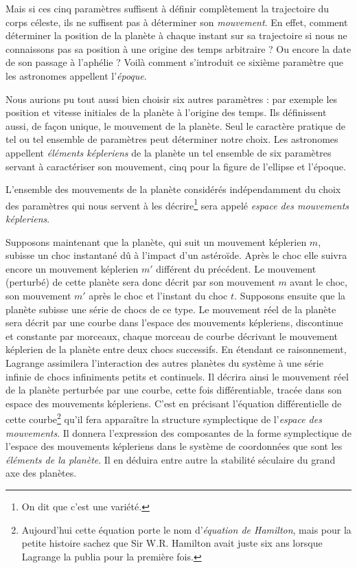 \documentclass[12pt,paperletter, reqno]{amsart}
\theoremstyle{plain}
\theoremstyle{remark}
\begin{document}
  Mais si ces cinq paramètres suffisent à définir complètement la trajectoire du corps céleste,
  ils ne suffisent pas à déterminer son \emph{mouvement}.
  En effet,
  comment déterminer la position de la planète à chaque instant sur sa trajectoire si nous ne connaissons pas sa position à une origine des temps arbitraire ?
  Ou encore la date de son passage à l'aphélie ?
  Voilà comment s'introduit ce sixième paramètre que les astronomes appellent l'\emph{époque}.
  
  Nous aurions pu tout aussi bien choisir six autres paramètres :
  par exemple les position et vitesse initiales de la planète à l'origine des temps.
  Ils définissent aussi,
  de façon unique,
  le mouvement de la planète.
  Seul le caractère pratique de tel ou tel ensemble de paramètres peut déterminer notre choix.
  Les astronomes appellent \emph{éléments képleriens} de la planète un tel ensemble de six paramètres servant à caractériser son mouvement,
  cinq pour la figure de l'ellipse et l'époque.
  
  L'ensemble des mouvements de la planète considérés indépendamment du choix des paramètres qui nous servent à les décrire\footnote{On dit que c'est une variété.} sera appelé \emph{espace des mouvements képleriens}.
  
  Supposons maintenant que la planète,
  qui suit un mouvement képlerien $m$,
  subisse un choc instantané dû à l'impact d'un astéroïde.
  Après le choc elle suivra encore un mouvement képlerien $m'$ différent du précédent.
  Le mouvement (perturbé) de cette planète sera donc décrit par son mouvement $m$ avant le choc,
  son mouvement $m'$ après le choc et l'instant du choc $t$.
  Supposons ensuite que la planète subisse une série de chocs de ce type.
  Le mouvement réel de la planète sera décrit par une courbe dans l'espace des mouvements képleriens,
  discontinue et constante par morceaux,
  chaque morceau de courbe décrivant le mouvement képlerien de la planète entre deux chocs successifs.
  En étendant ce raisonnement,
  Lagrange assimilera l'interaction des autres planètes du système à une série infinie de chocs \og infiniments petits et continuels\fg{}.
  Il décrira ainsi le mouvement réel de la planète perturbée par une courbe,
  cette fois différentiable,
  tracée dans son espace des mouvements képleriens.
  C'est en précisant l'équation différentielle de cette courbe\footnote{Aujourd'hui cette équation porte le nom d'\emph{équation de Hamilton}, mais pour la petite histoire sachez que Sir W.R. Hamilton avait juste six ans lorsque Lagrange la publia pour la première fois.} qu'il fera apparaître la structure symplectique de l'\emph{espace des mouvements}.
  Il donnera l'expression des composantes de la forme symplectique de l'espace des mouvements képleriens dans le système de coordonnées que sont les \emph{éléments de la planète}.
  Il en déduira entre autre la stabilité séculaire du grand axe des planètes.
  
\end{document}
